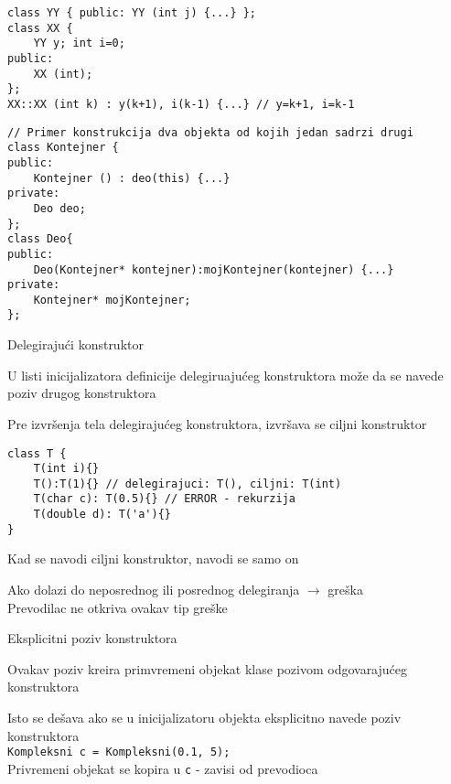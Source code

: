 \documentclass{article}
\newenvironment{xitemize}{%
    
    \itemize
    \larger
}{%
    \enditemize
}
\let\olditemize\itemize
\let\endolditemize\enditemize
\renewenvironment{itemize}{%
    \smaller
    \olditemize
}{%
    \endolditemize
}
\providecommand{\inlinecode}[1]{\texttt{#1}}
\begin{document}
\begin{xitemize}
\begin{itemize}
    \begin{lstlisting}
class YY { public: YY (int j) {...} };
class XX {
    YY y; int i=0;
public:
    XX (int);
};
XX::XX (int k) : y(k+1), i(k-1) {...} // y=k+1, i=k-1
    \end{lstlisting}
    \begin{lstlisting}
// Primer konstrukcija dva objekta od kojih jedan sadrzi drugi
class Kontejner {
public:
    Kontejner () : deo(this) {...}
private:
    Deo deo;
};
class Deo{
public:
    Deo(Kontejner* kontejner):mojKontejner(kontejner) {...}
private:
    Kontejner* mojKontejner;
};
    \end{lstlisting}
    \end{itemize}
\begin{multicols}{2}
\item Delegirajući konstruktor
\begin{itemize}
    \item U listi inicijalizatora definicije delegiruajućeg konstruktora može da se navede poziv drugog konstruktora
    \item Pre izvršenja tela delegirajućeg konstruktora, izvršava se ciljni konstruktor
\end{itemize}
\columnbreak
\begin{lstlisting}
class T {
    T(int i){}
    T():T(1){} // delegirajuci: T(), ciljni: T(int)
    T(char c): T(0.5){} // ERROR - rekurzija
    T(double d): T('a'){}   
}
\end{lstlisting}
\end{multicols}
\begin{itemize}
     \item Kad se navodi ciljni konstruktor, navodi se samo on
    \item Ako dolazi do neposrednog ili posrednog delegiranja $\rightarrow$ greška\\
    Prevodilac ne otkriva ovakav tip greške
\end{itemize}
\item Eksplicitni poziv konstruktora
\begin{itemize}
    \item Ovakav poziv kreira primvremeni objekat klase pozivom odgovarajućeg konstruktora
    \item Isto se dešava ako se u inicijalizatoru objekta eksplicitno navede poziv konstruktora\\
    \inlinecode{Kompleksni c = Kompleksni(0.1, 5);}\\
    Privremeni objekat se kopira u \inlinecode c - zavisi od prevodioca

\end{itemize}
\end{xitemize}
\end{document}
